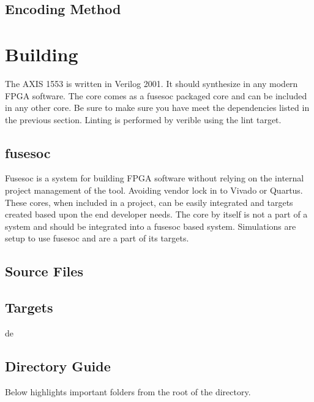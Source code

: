 \subsection{Encoding Method}
\par


\section{Building}

\par
The AXIS 1553 is written in Verilog 2001. It should synthesize in any modern FPGA software. The core comes as a fusesoc packaged core and can be included in any other core. Be sure to make sure you have meet the dependencies listed in the previous section. Linting is performed by verible using the lint target.

\subsection{fusesoc}
\par
Fusesoc is a system for building FPGA software without relying on the internal project management of the tool. Avoiding vendor lock in to Vivado or Quartus.
These cores, when included in a project, can be easily integrated and targets created based upon the end developer needs. The core by itself is not a part of
a system and should be integrated into a fusesoc based system. Simulations are setup to use fusesoc and are a part of its targets.

\subsection{Source Files}



\subsection{Targets}

de

\subsection{Directory Guide}

\par
Below highlights important folders from the root of the directory.

